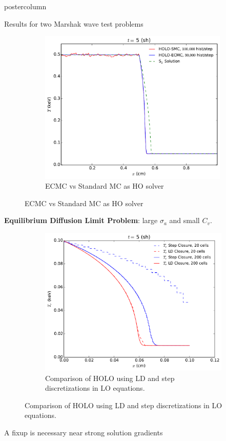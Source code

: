 \documentclass[xcolor=dvipsnames]{beamer}
\newcommand{\colb}[1]{{\color{blue} #1}}
\newcommand{\colr}[1]{{\color{red} #1}}
\begin{document}
\begin{frame}
\begin{columns}
\begin{column}{.49\textwidth}
\begin{beamercolorbox}[center,wd=\textwidth]{postercolumn}
\begin{minipage}[T]{0.95\textwidth}
{\begin{block}{Results for two Marshak wave test problems}
\begin{figure}
\begin{subfigure}{0.49\textwidth}
    \includegraphics[width=0.99\textwidth]{two_mat_ho_compare.pdf}
    \caption{\colb{ECMC} vs \colr{Standard MC} as HO solver \label{twomat_quick}}
\end{subfigure}
\end{figure}
    \vspace{1.5em}
\centering \textbf{Equilibrium Diffusion Limit Problem}: large $\sigma_a$ and small $C_v$.
\begin{figure}
    \begin{subfigure}{0.99\textwidth}
  \centering
    \includegraphics[width=0.49\linewidth]{diff_limit_compare.pdf}
\caption{\label{diff_limit_compare}Comparison of HOLO using LD and step discretizations in LO equations.}
  \end{subfigure}
\end{figure}
    \end{block}
    \vfill
    \vfill
    \vfill
    \begin{block}{A fixup is necessary near strong solution gradients}

\end{block}}
\end{minipage}
\end{beamercolorbox}
\end{column}
\end{columns}
\end{frame}
\end{document}
